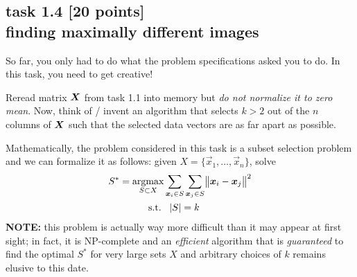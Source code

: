 
\subsection*{task 1.4 [20 points] \\[1ex] finding maximally different images}

So far, you only had to do what the problem specifications asked you to do. In this task, you need to get creative!

Reread matrix $\bm{X}$ from task 1.1 into memory but \emph{do not normalize it to zero mean}. Now, think of / invent an algorithm that selects $k>2$ out of the $n$ columns of $\bm{X}$ such that the selected data vectors are as far apart as possible. 

Mathematically, the problem considered in this task is a subset selection problem and we can formalize it as follows: given $X = \{ \vec{x}_1, \ldots, \vec{x}_n \}$, solve
\begin{align*}
S^* = \operatorname*{argmax}_{S \subset X} & \sum_{\bm{x}_i \in S} \sum_{\bm{x}_j \in S} \bigl \lVert \bm{x}_i - \bm{x}_j \bigr \rVert^2 \\
\operatorname{s.\!t.} \; & \; \; \lvert S \rvert = k
\end{align*}
\textbf{NOTE:} this problem is actually way more difficult than it may appear at first sight; in fact, it is NP-complete and an \textit{efficient} algorithm that is \textit{guaranteed} to find the optimal $S^*$ for very large sets $X$ and arbitrary choices of $k$ remains elusive to this date. \vspace{1ex}

